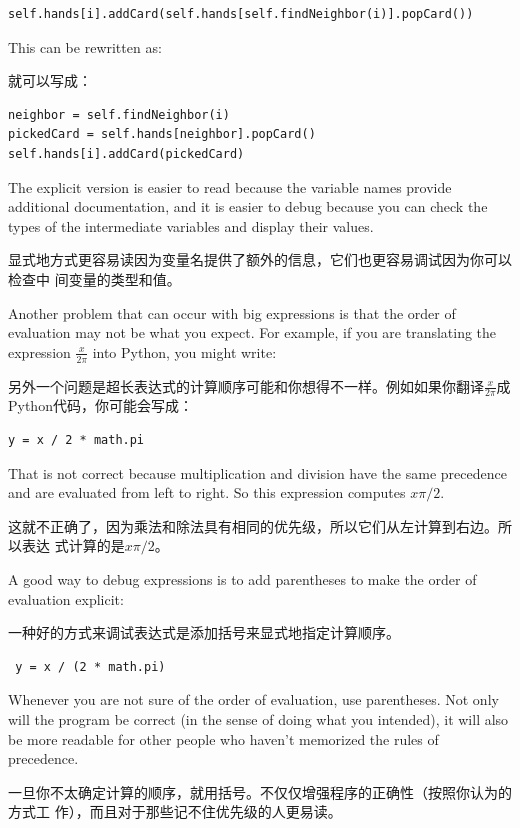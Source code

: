 \documentclass[10pt]{book}
\begin{document}
\begin{CJK}{UTF8}{gbsn}
\begin{verbatim}
self.hands[i].addCard(self.hands[self.findNeighbor(i)].popCard())
\end{verbatim}
%
This can be rewritten as:

就可以写成：

\begin{verbatim}
neighbor = self.findNeighbor(i)
pickedCard = self.hands[neighbor].popCard()
self.hands[i].addCard(pickedCard)
\end{verbatim}
%
The explicit version is easier to read because the variable
names provide additional documentation, and it is easier to debug
because you can check the types of the intermediate variables
and display their values.

显式地方式更容易读因为变量名提供了额外的信息，它们也更容易调试因为你可以检查中
间变量的类型和值。

Another problem that can occur with big expressions is
that the order of evaluation may not be what you expect.
For example, if you are translating the expression
$\frac{x}{2 \pi}$ into Python, you might write:

另外一个问题是超长表达式的计算顺序可能和你想得不一样。例如如果你翻译$\frac{x}{2
\pi}$成Python代码，你可能会写成：

\begin{verbatim}
y = x / 2 * math.pi
\end{verbatim}
%
That is not correct because multiplication and division have
the same precedence and are evaluated from left to right.
So this expression computes $x \pi / 2$.

这就不正确了，因为乘法和除法具有相同的优先级，所以它们从左计算到右边。所以表达
式计算的是$x \pi / 2$。

A good way to debug expressions is to add parentheses to make
the order of evaluation explicit:

一种好的方式来调试表达式是添加括号来显式地指定计算顺序。

\begin{verbatim}
 y = x / (2 * math.pi)
\end{verbatim}
%
Whenever you are not sure of the order of evaluation, use
parentheses.  Not only will the program be correct (in the sense
of doing what you intended), it will also be more readable for
other people who haven't memorized the rules of precedence.

一旦你不太确定计算的顺序，就用括号。不仅仅增强程序的正确性（按照你认为的方式工
作），而且对于那些记不住优先级的人更易读。



\end{CJK}
\end{document}
